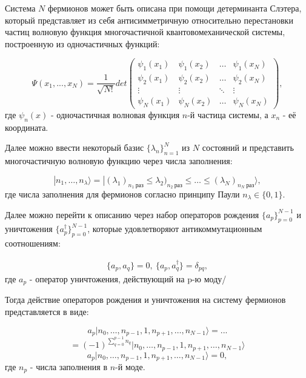 \documentclass[14pt]{extarticle}
\begin{document}
\qquad Система $N$ фермионов может быть описана при помощи детерминанта Слэтера, который представляет из себя антисимметричную относительно перестановки частиц волновую функция многочастичной квантовомеханической системы, построенную из одночастичных функций:



\begin{equation}
\Psi{(x_1, ... , x_N)} = \frac{1}{\sqrt{N!}} det \left(
\begin{array}{cccc}
\psi_{1} (x_1) & \psi_{1} (x_2) & \ldots & \psi_{1} (x_N)\\
\psi_{2} (x_1) & \psi_{2} (x_2) & \ldots & \psi_{2} (x_N)\\
\vdots & \vdots & \ddots & \vdots\\
\psi_{N} (x_1) & \psi_{N} (x_2) & \ldots & \psi_{N} (x_N)
\end{array}
\right),
\end{equation} где $\psi_{n} (x)$ - одночастичная волновая функция $n$-й частица системы, а $x_n$ - её координата.

\qquad Далее можно ввести некоторый базис $\{ \lambda_n \}^{N}_{n = 1}$ из $N$ состояний и представить многочастичную волновую функцию через числа заполнения:

\begin{equation}
|n_1,  \ldots  , n_{\lambda} \rangle = |(\lambda_1)_{n_1 \ раз} \leq \lambda_2)_{n_2 \ раз} \leq  \ldots  \leq (\lambda_N)_{n_N \ раз} \rangle,
\end{equation} где числа заполнения для фермионов согласно принципу Паули $n_{\lambda} \in \{ 0,1 \}$.


\qquad Далее можно перейти к описанию через набор операторов рождения $\{ a_{p} \}^{N-1}_{p=0} $ и уничтожения $\{ a^{\dagger}_{p} \}^{N-1}_{p=0} $, которые удовлетворяют антикоммутационным соотношениям:

\begin{eqnarray}
	\{ a_{p}, a_{q} \} = 0, \
	\{ a_{p}, a^{\dagger}_{q} \} = \delta_{pq},
\end{eqnarray} где $a_{p}$ - оператор уничтожения, действующий на p-ю моду/

\qquad Тогда действие операторов рождения и уничтожения на систему фермионов представляется в виде:

\begin{equation*}
a_p | n_0, \ldots, n_{p-1}, 1, n_{p+1}, \ldots, n_{N-1} \rangle = ...
\end{equation*}
\begin{equation}
 = (-1)^{\sum^{p-1}_{q=0} n_q} | n_0, \ldots, n_{p-1}, 1, n_{p+1}, \ldots, n_{N-1} \rangle
\end{equation}
\begin{equation*}
a_p | n_0, \ldots, n_{p-1}, 1, n_{p+1}, \ldots, n_{N-1} \rangle = 0,
\end{equation*} где $ n_p $ - числа заполнения в $n$-й моде.
\end{document}

